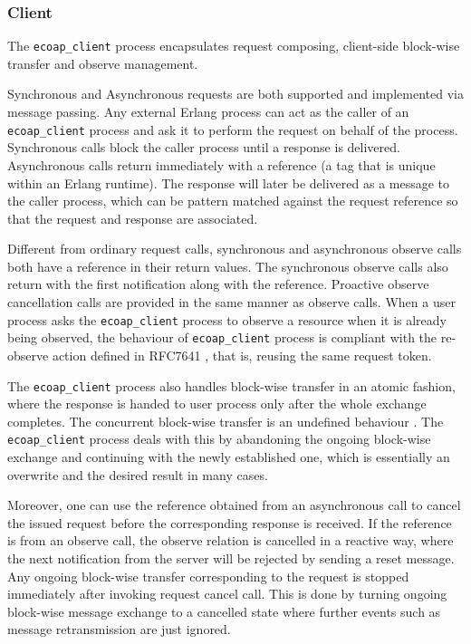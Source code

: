 \subsubsection{Client}

The \verb|ecoap_client| process encapsulates request composing, client-side block-wise transfer and observe management. 

Synchronous and Asynchronous requests are both supported and implemented via message passing. Any external Erlang process can act as the caller of an \verb|ecoap_client| process and ask it to perform the request on behalf of the process. Synchronous calls block the caller process until a response is delivered. Asynchronous calls return immediately with a reference (a tag that is unique within an Erlang runtime). The response will later be delivered as a message to the caller process, which can be pattern matched against the request reference so that the request and response are associated. 

Different from ordinary request calls, synchronous and asynchronous observe calls both have a reference in their return values. The synchronous observe calls also return with the first notification along with the reference. Proactive observe cancellation calls are provided in the same manner as observe calls. When a user process asks the \verb|ecoap_client| process to observe a resource when it is already being observed, the behaviour of \verb|ecoap_client| process is compliant with the re-observe action defined in RFC7641 \autocite{coap_observe}, that is, reusing the same request token.

The \verb|ecoap_client| process also handles block-wise transfer in an atomic fashion, where the response is handed to user process only after the whole exchange completes. The concurrent block-wise transfer is an undefined behaviour \autocite{blockwise}. The \verb|ecoap_client| process deals with this by abandoning the ongoing block-wise exchange and continuing with the newly established one, which is essentially an overwrite and the desired result in many cases.

Moreover, one can use the reference obtained from an asynchronous call to cancel the issued request before the corresponding response is received. If the reference is from an observe call, the observe relation is cancelled in a reactive way, where the next notification from the server will be rejected by sending a reset message. Any ongoing block-wise transfer corresponding to the request is stopped immediately after invoking request cancel call. This is done by turning ongoing block-wise message exchange to a cancelled state where further events such as message retransmission are just ignored.

